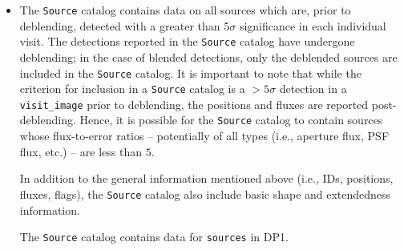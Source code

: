 \begin{itemize}
\item The \texttt{Source} catalog \citep{10.71929/rubin/2570323} contains data on all sources which are, prior to deblending, detected with a greater than 5$\sigma$ significance in each individual visit.
The detections reported in the \texttt{Source} catalog have undergone deblending; in the case of blended detections, only the deblended sources are included in the \texttt{Source} catalog.
It is important to note that while the criterion for inclusion in a \texttt{Source} catalog is a $>5\sigma$ detection in a \texttt{visit\_image} prior to deblending, the positions and fluxes are reported post-deblending. Hence, it is possible for the \texttt{Source} catalog to contain sources whose \gls{flux}-to-error ratios -- potentially of all types (i.e., aperture \gls{flux}, \gls{PSF} \gls{flux}, etc.) -- are less than $5$.

In addition to the general information mentioned above (i.e., IDs, positions, fluxes, flags), the \texttt{Source} catalog also include basic \gls{shape} and extendedness information.

The \texttt{Source} catalog contains data for \nsources \texttt{sources} in \gls{DP1}.



\end{itemize}
